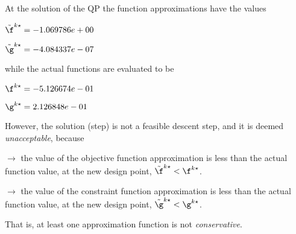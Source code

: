 At the solution of the QP the function approximations have the values

$\tilde \f^{k\star} = -1.069786e+00$

$\tilde \g^{k\star} = -4.084337e-07$

\bigskip
while the actual functions are evaluated to be

$\f^{k\star} = -5.126674e-01$

$\g^{k\star} =  2.126848e-01$

\bigskip
 However, the solution (step)                         is not a feasible descent step, and it is deemed                         \emph{unacceptable}, because 
 
$\to$ the value of the objective                             function approximation is less than the actual function                             value, at the new design point,                             $\tilde {\f}^{k\star} < {\f}^{k\star}$.

 $\to$ the value of the constraint function                             approximation is less than the actual function value, at                             the new design point, $\tilde {\g}^{k\star} < {\g}^{k\star}$.

 \bigskip 

 That is, at least one approximation                         function is not \emph{conservative}.
